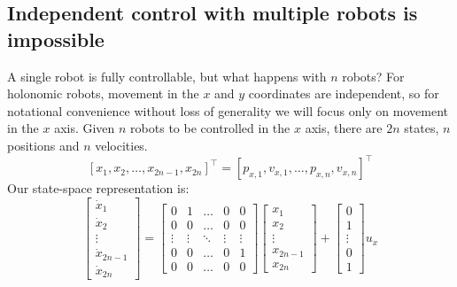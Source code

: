 \subsection{Independent control with multiple robots is impossible}
A single robot is fully controllable, but what happens with $n$ robots? For holonomic robots, movement in the $x$ and $y$ coordinates are independent, so for notational convenience without loss of generality we will focus only on movement in the $x$ axis. Given $n$ robots to be  controlled in the $x$ axis, there are $2n$ states, $n$ positions and $n$ velocities.
\begin{equation}\left[ x_1,x_2,\ldots, x_{2n-1},x_{2n}\right]^\intercal = \left[ p_{x,1},v_{x,1},\ldots,p_{x,n},v_{x,n}\right]^\intercal \nonumber\end{equation}
Our state-space representation is:
\begin{equation}
\begin{bmatrix}
\dot{x}_1\\ 
\dot{x}_2\\
\vdots\\
\dot{x}_{2n-1}\\
\dot{x}_{2n}

\end{bmatrix} = \begin{bmatrix}
0 & 1 & \ldots & 0 & 0 \\
0 & 0 & \ldots& 0 & 0 \\
\vdots &  \vdots & \ddots & \vdots & \vdots \\
0 & 0  & \ldots & 0 & 1 \\
0 & 0 & \ldots& 0 & 0 
\end{bmatrix}  \begin{bmatrix}
x_1\\
x_2\\
\vdots \\
x_{2n-1}\\
x_{2n}
\end{bmatrix} + \begin{bmatrix}
0\\
1\\
\vdots\\
0\\
1
\end{bmatrix} u_x
\end{equation}
